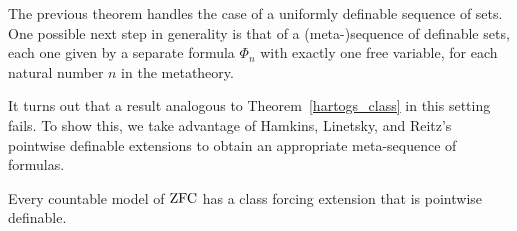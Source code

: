 The previous theorem handles the case of a uniformly
definable sequence of sets. One possible next step in generality is that of a
(meta-)sequence of definable sets, each one given by a separate formula $\Phi_n$
with exactly one free variable, for each natural number $n$ in the
metatheory.

It turns out that a result analogous to Theorem~\ref{hartogs_class} in this
setting fails. To show this, we take advantage of
Hamkins, Linetsky, and Reitz's pointwise definable extensions to obtain an appropriate
meta-sequence of formulas.
\begin{theorem}\label{th:pointwise-extension}
  Every countable model of $\mathrm{ZFC}$ has a class forcing extension that is
  pointwise definable.
\end{theorem}

